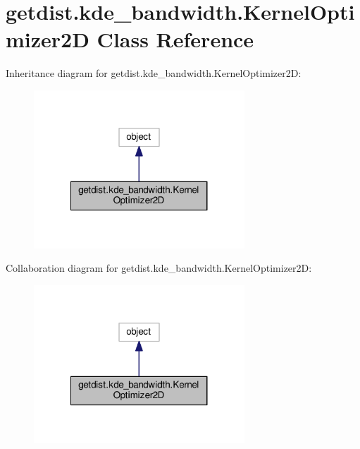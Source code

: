 \hypertarget{classgetdist_1_1kde__bandwidth_1_1KernelOptimizer2D}{}\section{getdist.\+kde\+\_\+bandwidth.\+Kernel\+Optimizer2D Class Reference}
\label{classgetdist_1_1kde__bandwidth_1_1KernelOptimizer2D}


Inheritance diagram for getdist.\+kde\+\_\+bandwidth.\+Kernel\+Optimizer2D\+:
\nopagebreak
\begin{figure}[H]
\begin{center}
\leavevmode
\includegraphics[width=224pt]{classgetdist_1_1kde__bandwidth_1_1KernelOptimizer2D__inherit__graph}
\end{center}
\end{figure}


Collaboration diagram for getdist.\+kde\+\_\+bandwidth.\+Kernel\+Optimizer2D\+:
\nopagebreak
\begin{figure}[H]
\begin{center}
\leavevmode
\includegraphics[width=224pt]{classgetdist_1_1kde__bandwidth_1_1KernelOptimizer2D__coll__graph}
\end{center}
\end{figure}
